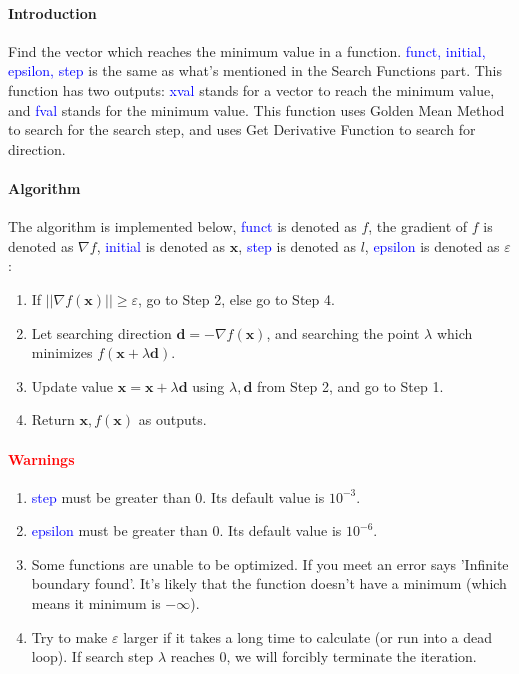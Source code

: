 \documentclass{article}
\begin{document}
\paragraph{Introduction}
Find the vector which reaches the minimum value in a function. \textcolor{blue}{funct, initial, epsilon, step} is the same as what's mentioned in the Search Functions part. This function has two outputs: \textcolor{blue}{xval} stands for a vector to reach the minimum value, and \textcolor{blue}{fval} stands for the minimum value. This function uses Golden Mean Method to search for the search step, and uses Get Derivative Function to search for direction.

\paragraph{Algorithm}
The algorithm is implemented below, \textcolor{blue}{funct} is denoted as $f$, the gradient of $f$ is denoted as $\nabla f$, \textcolor{blue}{initial} is denoted as $\mathbf{x}$, \textcolor{blue}{step} is denoted as $l$, \textcolor{blue}{epsilon} is denoted as $\varepsilon$:
\begin{enumerate}
    \item If $||\nabla f(\mathbf{x})|| \geqslant \varepsilon$, go to Step 2, else go to Step 4.
    \item Let searching direction $\mathbf{d} = -\nabla f(\mathbf{x})$, and searching the point $\lambda$ which minimizes $f(\mathbf{x} + \lambda \mathbf{d})$.
    \item Update value $\mathbf{x} = \mathbf{x} + \lambda \mathbf{d}$ using $\lambda, \mathbf{d}$ from Step 2, and go to Step 1.
    \item Return $\mathbf{x}, f(\mathbf{x})$ as outputs.
\end{enumerate}

\paragraph{\textcolor{red}{Warnings}}
\begin{enumerate}
    \item \textcolor{blue}{step} must be greater than $0$. Its default value is $10^{-3}$.
    \item \textcolor{blue}{epsilon} must be greater than $0$. Its default value is $10^{-6}$.
    \item Some functions are unable to be optimized. If you meet an error says 'Infinite boundary found'. It's likely that the function doesn't have a minimum (which means it minimum is $-\infty$).
    \item Try to make $\varepsilon$ larger if it takes a long time to calculate (or run into a dead loop). If search step $\lambda$ reaches $0$, we will forcibly terminate the iteration.
\end{enumerate}
\end{document}
